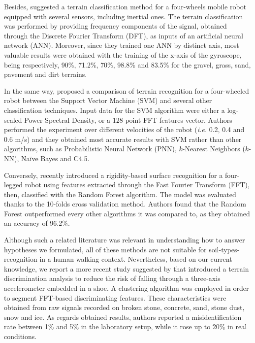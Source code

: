 \documentclass[conference]{IEEEtran}
\begin{document}
Besides, \citet{Bibuli2007} suggested a terrain classification method for a four-wheels mobile robot equipped with several sensors, including inertial ones. The terrain classification was performed by providing frequency components of the signal, obtained through the Discrete Fourier Transform (DFT), as inputs of an artificial neural network (ANN). Moreover, since they trained one ANN by distinct axis, most valuable results were obtained with the training of the x-axis of the gyroscope, being respectively, 90\%, 71.2\%, 70\%, 98.8\% and 83.5\% for the gravel, grass, sand, pavement and dirt terrains.

In the same way, \citet{Weiss2007} proposed a comparison of terrain recognition for a four-wheeled robot between the Support Vector Machine (SVM) and several other classification techniques. Input data for the SVM algorithm were either a log-scaled Power Spectral Density, or a 128-point FFT features vector. Authors performed the experiment over different velocities of the robot (\textit{i.e.} 0.2, 0.4 and 0.6 m/s) and they obtained most accurate results with SVM rather than other algorithms, such as Probabilistic Neural Network (PNN), $k$-Nearest Neighbors ($k$-NN), Na\"ive Bayes and C4.5. 

Conversely, \citet{Kertesz2016} recently introduced a rigidity-based surface recognition for a four-legged robot using features extracted through the Fast Fourier Transform (FFT), then, classified with the Random Forest algorithm. The model was evaluated thanks to the 10-folds cross validation method. Authors found that the Random Forest outperformed every other algorithms it was compared to, as they obtained an accuracy of 96.2\%.

Although such a related literature was relevant in understanding how to answer hypotheses we formulated, all of these methods are not suitable for soil-types-recognition in a human walking context. Nevertheless, based on our current knowledge, we report a more recent study suggested by \citet{Otis2016} that introduced a terrain discrimination analysis to reduce the risk of falling through a three-axis accelerometer embedded in a shoe. A clustering algorithm was employed in order to segment FFT-based discriminating features. These characteristics were obtained from raw signals recorded on broken stone, concrete, sand, stone dust, snow and ice. As regards obtained results, authors reported a misidentification rate between 1\% and 5\% in the laboratory setup, while it rose up to 20\% in real conditions.
\end{document}
